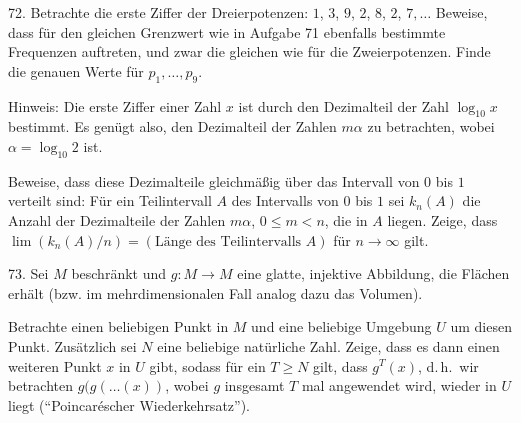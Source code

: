 \begin{problem}{72.}
	Betrachte die erste Ziffer der Dreierpotenzen: $1$, $3$, $9$, $2$, $8$, $2$, $7, \dotsc$ Beweise, dass für den gleichen Grenzwert wie in Aufgabe 71 ebenfalls bestimmte Frequenzen auftreten, und zwar die gleichen wie für die Zweierpotenzen. Finde die genauen Werte für $p_1, \dotsc, p_9$.
	\begin{note}{Hinweis:}
		Die erste Ziffer einer Zahl $x$ ist durch den Dezimalteil der Zahl $\log_{10} x$ bestimmt. Es genügt also, den Dezimalteil der Zahlen $m \alpha$ zu betrachten, wobei $\alpha=\log_{10} 2$ ist.
	\end{note}
	Beweise, dass diese Dezimalteile gleichmäßig über das Intervall von $0$ bis $1$ verteilt sind: Für ein Teilintervall $A$ des Intervalls von $0$ bis $1$ sei $k_n(A)$ die Anzahl der Dezimalteile der Zahlen $m\alpha$, $0 \leqslant m < n$, die in $A$ liegen. Zeige, dass $\lim(k_n(A)/n)=(\text{Länge des Teilintervalls $A$})$ für $n\rightarrow \infty$ gilt.
\end{problem}

\begin{problem}{73.}
	Sei $M$ beschränkt und $g\colon M \to M$ eine glatte, injektive Abbildung, die Flächen erhält (bzw. im mehrdimensionalen Fall analog dazu das Volumen). 
	 
	Betrachte einen beliebigen Punkt in $M$ und eine beliebige Umgebung $U$ um diesen Punkt. Zusätzlich sei $N$ eine beliebige natürliche Zahl. 
	Zeige, dass es dann einen weiteren Punkt $x$ in $U$ gibt, sodass für ein $T\geq N$ gilt, dass $g^T (x)$, d.\,h.\ wir betrachten $g(g(\dots (x))$, wobei $g$ insgesamt $T$ mal angewendet wird, wieder in $U$ liegt (\enquote{Poincaréscher Wiederkehrsatz}).
\end{problem}

